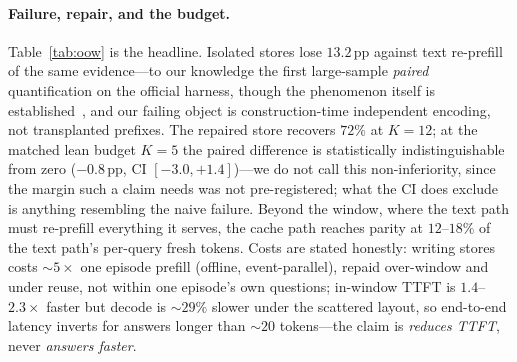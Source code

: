 \documentclass{article} %
\newcommand{\pp}{\,\mathrm{pp}}
\begin{document}
\paragraph{Failure, repair, and the budget.} Table~\ref{tab:oow} is the headline. Isolated
stores lose $13.2\pp$ against text re-prefill of the same evidence---to our knowledge the
first large-sample \emph{paired} quantification on the official harness, though the
phenomenon itself is established~\citep{sparsex}, and our failing object is
construction-time independent encoding, not transplanted prefixes. The repaired store
recovers $72\%$ at $K{=}12$; at the matched lean budget $K{=}5$ the paired difference is
statistically indistinguishable from zero ($-0.8\pp$, CI $[-3.0,+1.4]$)---we do not call
this non-inferiority, since the margin such a claim needs was not pre-registered; what
the CI does exclude is anything resembling the naive failure. Beyond the window, where the text path must
re-prefill everything it serves, the cache path reaches parity at $12$--$18\%$ of the text
path's per-query fresh tokens. Costs are stated honestly: writing stores costs
${\sim}5\times$ one episode prefill (offline, event-parallel), repaid over-window and under
reuse, not within one episode's own questions; in-window TTFT is $1.4$--$2.3\times$ faster
but decode is ${\sim}29\%$ slower under the scattered layout, so end-to-end latency inverts
for answers longer than ${\sim}20$ tokens---the claim is \emph{reduces TTFT}, never
\emph{answers faster}.
\end{document}
